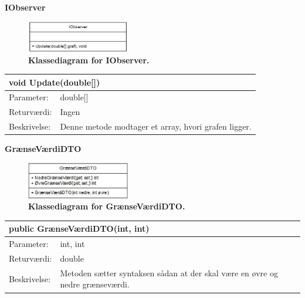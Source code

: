 \textbf{IObserver}
\begin{figure}[H]
\includegraphics[width =0.4\textwidth , center]{billeder/klassediagramIobserver}
\caption{\textbf{Klassediagram for IObserver.}}
\end{figure}
\begin{table}[H]
\label{tab:tabel2}
\begin{tabular}{| l | p{13cm} |}
   \hline
   \multicolumn{2}{|l|}{void Update(double[])} \\ \hline
   Parameter: & double[]\\ \hline
   Returværdi: & Ingen \\ \hline
   Beskrivelse: & Denne metode modtager et array, hvori grafen ligger.\\ \hline
\end{tabular}
\end{table}


\textbf{GrænseVærdiDTO}
\begin{figure}[H]
\includegraphics[width =0.4\textwidth , center]{billeder/klassediagramgransevardiDTO}
\caption{\textbf{Klassediagram for GrænseVærdiDTO.}}
\end{figure}
\begin{table}[H]
\label{tab:tabel2}
\begin{tabular}{| l | p{13cm} |}
   \hline
   \multicolumn{2}{|l|}{public GrænseVærdiDTO(int, int)} \\ \hline
   Parameter: & int, int\\ \hline
   Returværdi: & double \\ \hline
   Beskrivelse: & Metoden sætter syntaksen sådan at der skal være en øvre og nedre grænseværdi.\\ \hline
\end{tabular}
\end{table}

